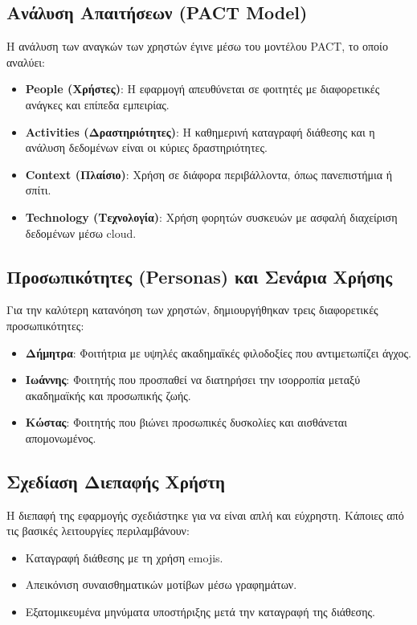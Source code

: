 \subsection*{Ανάλυση Απαιτήσεων (PACT Model)}
Η ανάλυση των αναγκών των χρηστών έγινε μέσω του μοντέλου PACT, το οποίο αναλύει:
\begin{itemize}
    \item \textbf{People (Χρήστες)}: Η εφαρμογή απευθύνεται σε φοιτητές με διαφορετικές ανάγκες και επίπεδα εμπειρίας.
    \item \textbf{Activities (Δραστηριότητες)}: Η καθημερινή καταγραφή διάθεσης και η ανάλυση δεδομένων είναι οι κύριες δραστηριότητες.
    \item \textbf{Context (Πλαίσιο)}: Χρήση σε διάφορα περιβάλλοντα, όπως πανεπιστήμια ή σπίτι.
    \item \textbf{Technology (Τεχνολογία)}: Χρήση φορητών συσκευών με ασφαλή διαχείριση δεδομένων μέσω cloud.
\end{itemize}

\subsection*{Προσωπικότητες (Personas) και Σενάρια Χρήσης}
Για την καλύτερη κατανόηση των χρηστών, δημιουργήθηκαν τρεις διαφορετικές προσωπικότητες:
\begin{itemize}
    \item \textbf{Δήμητρα}: Φοιτήτρια με υψηλές ακαδημαϊκές φιλοδοξίες που αντιμετωπίζει άγχος.
    \item \textbf{Ιωάννης}: Φοιτητής που προσπαθεί να διατηρήσει την ισορροπία μεταξύ ακαδημαϊκής και προσωπικής ζωής.
    \item \textbf{Κώστας}: Φοιτητής που βιώνει προσωπικές δυσκολίες και αισθάνεται απομονωμένος.
\end{itemize}

\subsection*{Σχεδίαση Διεπαφής Χρήστη}
Η διεπαφή της εφαρμογής σχεδιάστηκε για να είναι απλή και εύχρηστη. Κάποιες από τις βασικές λειτουργίες περιλαμβάνουν:
\begin{itemize}
    \item Καταγραφή διάθεσης με τη χρήση emojis.
    \item Απεικόνιση συναισθηματικών μοτίβων μέσω γραφημάτων.
    \item Εξατομικευμένα μηνύματα υποστήριξης μετά την καταγραφή της διάθεσης.
\end{itemize}

